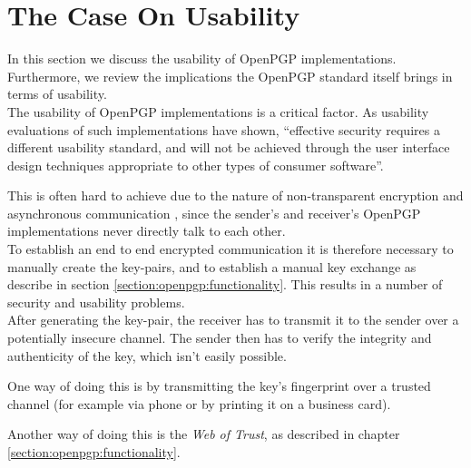 

\section{The Case On Usability} \label{section:concerns:usability}

In this section we discuss the usability of OpenPGP implementations. Furthermore, we review the implications the OpenPGP standard itself brings in terms of usability. \\


The usability of OpenPGP implementations is a critical factor. As usability evaluations of such implementations \cite{Whitten1999} have shown, ``effective security requires a different usability standard, and will not be achieved through the user interface design techniques appropriate to other types of consumer software''.

This is often hard to achieve due to the nature of non-transparent encryption and asynchronous communication \citep[section 2.1]{RFC4880}, since the sender's and receiver's OpenPGP implementations never directly talk to each other. \\

To establish an end to end encrypted communication it is therefore necessary to manually create the key-pairs, and to establish a manual key exchange as describe in section \ref{section:openpgp:functionality}. This results in a number of security and usability problems.  \\


After generating the key-pair, the receiver has to transmit it to the sender over a potentially insecure channel. The sender then has to verify the integrity and authenticity of the key, which isn't easily possible.

One way of doing this is by transmitting the key's fingerprint over a trusted channel (for example via phone or by printing it on a business card). 

Another way of doing this is the \textit{Web of Trust}, as described in chapter \ref{section:openpgp:functionality}. \\

